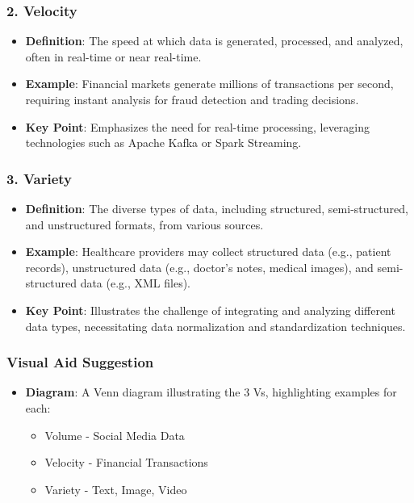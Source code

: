 \documentclass[aspectratio=169]{beamer}
\begin{document}
\begin{frame}[fragile]
    \frametitle{2. Velocity}
    \begin{itemize}
        \item \textbf{Definition}: The speed at which data is generated, processed, and analyzed, often in real-time or near real-time.
        \item \textbf{Example}: Financial markets generate millions of transactions per second, requiring instant analysis for fraud detection and trading decisions.
        \item \textbf{Key Point}: Emphasizes the need for real-time processing, leveraging technologies such as Apache Kafka or Spark Streaming.
    \end{itemize}
\end{frame}

\begin{frame}[fragile]
    \frametitle{3. Variety}
    \begin{itemize}
        \item \textbf{Definition}: The diverse types of data, including structured, semi-structured, and unstructured formats, from various sources.
        \item \textbf{Example}: Healthcare providers may collect structured data (e.g., patient records), unstructured data (e.g., doctor’s notes, medical images), and semi-structured data (e.g., XML files).
        \item \textbf{Key Point}: Illustrates the challenge of integrating and analyzing different data types, necessitating data normalization and standardization techniques.
    \end{itemize}
\end{frame}

\begin{frame}[fragile]
    \frametitle{Visual Aid Suggestion}
    \begin{itemize}
        \item \textbf{Diagram}: A Venn diagram illustrating the 3 Vs, highlighting examples for each:
        \begin{itemize}
            \item Volume - Social Media Data
            \item Velocity - Financial Transactions
            \item Variety - Text, Image, Video
        \end{itemize}
    \end{itemize}
\end{frame}
\end{document}
